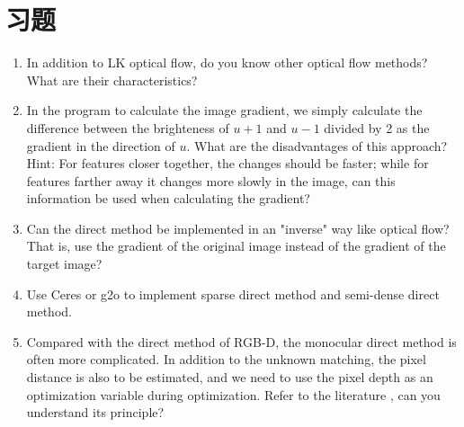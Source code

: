 \section*{习题}
\begin{enumerate}
	\item In addition to LK optical flow, do you know other optical flow methods? What are their characteristics?
	\item In the program to calculate the image gradient, we simply calculate the difference between the brighteness of $u+1$ and $u-1$ divided by 2 as the gradient in the direction of $u$. What are the disadvantages of this approach? Hint: For features closer together, the changes should be faster; while for features farther away it changes more slowly in the image, can this information be used when calculating the gradient?
	\item Can the direct method be implemented in an "inverse" way like optical flow? That is, use the gradient of the original image instead of the gradient of the target image?
	\item[\optional] Use Ceres or g2o to implement sparse direct method and semi-dense direct method.
	\item Compared with the direct method of RGB-D, the monocular direct method is often more complicated. In addition to the unknown matching, the pixel distance is also to be estimated, and we need to use the pixel depth as an optimization variable during optimization. Refer to the literature \cite{Engel2013, Engel2014}, can you understand its principle?
\end{enumerate}


